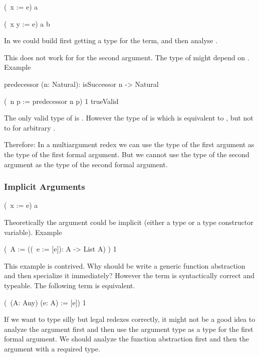 \begin{alba}
    (\ x := e) a

    (\ x y := e) a b
\end{alba}

In  we could build  first getting a type
 for the term, and then analyse .

This does not work for  for the second
argument. The type of  might depend on . Example
\begin{alba}
    predecessor (n: Natural): isSuccessor n -> Natural

    (\ n p := predecessor n p) 1 trueValid
\end{alba}
The only valid type of  is . However the type of
 is  which is equivalent to , but
not to  for arbitrary .

Therefore: In a multiargument redex we can use the type of the first argument as
the type of the first formal argument. But we cannot use the type of the second
argument as the type of the second formal argument.


\vskip 5mm
\subsubsection{Implicit Arguments}

\begin{alba}
    (\ x := e) a
\end{alba}

Theoretically the argument  could be implicit (either a type or a type
constructor variable). Example

\begin{alba}
    (\ A := ((\ e := [e]): A -> List A) ) 1
\end{alba}
%
This example is contrived. Why should be write a generic function abstraction
and then specialize it immediately? However the term is syntactically correct
and typeable. The following term is equivalent.

\begin{alba}
    (\ (A: Any) (e: A) := [e]) 1
\end{alba}

If we want to type silly but legal redexes correctly, it might not be a good
idea to analyze the argument first and then use the argument type as a type for
the first formal argument. We should analyze the function abstraction first and
then the argument with a required type.

